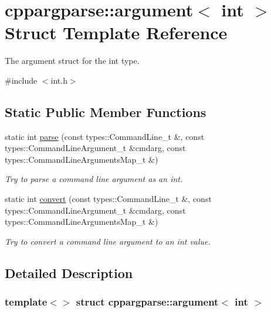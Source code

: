 \hypertarget{structcppargparse_1_1argument_3_01int_01_4}{}\section{cppargparse\+:\+:argument$<$ int $>$ Struct Template Reference}
\label{structcppargparse_1_1argument_3_01int_01_4}


The argument struct for the int type.  




{\ttfamily \#include $<$int.\+h$>$}

\subsection*{Static Public Member Functions}
\begin{DoxyCompactItemize}
\item 
static int \hyperlink{structcppargparse_1_1argument_3_01int_01_4_a6e26fa05cd9312bfc68889c9679a9908}{parse} (const types\+::\+Command\+Line\+\_\+t \&, const types\+::\+Command\+Line\+Argument\+\_\+t \&cmdarg, const types\+::\+Command\+Line\+Arguments\+Map\+\_\+t \&)
\begin{DoxyCompactList}\small\item\em Try to parse a command line argument as an int. \end{DoxyCompactList}\item 
static int \hyperlink{structcppargparse_1_1argument_3_01int_01_4_a0921c079e394b79f91bea0193786fa95}{convert} (const types\+::\+Command\+Line\+\_\+t \&, const types\+::\+Command\+Line\+Argument\+\_\+t \&cmdarg, const types\+::\+Command\+Line\+Arguments\+Map\+\_\+t \&)
\begin{DoxyCompactList}\small\item\em Try to convert a command line argument to an int value. \end{DoxyCompactList}\end{DoxyCompactItemize}


\subsection{Detailed Description}
\subsubsection*{template$<$$>$\newline
struct cppargparse\+::argument$<$ int $>$}

